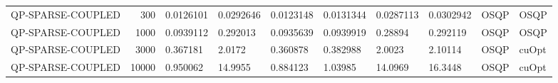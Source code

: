 \begin{table}
\begin{tabular}{lrllllllll}
QP-SPARSE-COUPLED & 300 & 0.0126101 & 0.0292646 & 0.0123148 & 0.0131344 & 0.0287113 & 0.0302942 & OSQP & OSQP \\
QP-SPARSE-COUPLED & 1000 & 0.0939112 & 0.292013 & 0.0935639 & 0.0939919 & 0.28894 & 0.292119 & OSQP & OSQP \\
QP-SPARSE-COUPLED & 3000 & 0.367181 & 2.0172 & 0.360878 & 0.382988 & 2.0023 & 2.10114 & OSQP & cuOpt \\
QP-SPARSE-COUPLED & 10000 & 0.950062 & 14.9955 & 0.884123 & 1.03985 & 14.0969 & 16.3448 & OSQP & cuOpt \\
\bottomrule
\end{tabular}
\end{table}
